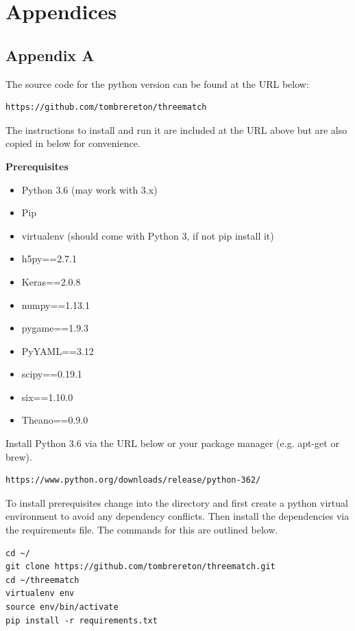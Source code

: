 \documentclass{bhamthesis}
\theoremstyle{definition}
\begin{document}
\chapter{Appendices}
\section*{Appendix A}
The source code for the python version can be found at the URL below:
\begin{verbatim}
https://github.com/tombrereton/threematch
\end{verbatim}

\noindent The instructions to install and run it are included at the URL above but are also copied in below for convenience.

\noindent \textbf{Prerequisites}

\begin{itemize}
	\item Python 3.6 (may work with 3.x)
	\item Pip
	\item virtualenv (should come with Python 3, if not pip install it)
	\item h5py==2.7.1
	\item Keras==2.0.8
	\item numpy==1.13.1
	\item pygame==1.9.3
	\item PyYAML==3.12
	\item scipy==0.19.1
	\item six==1.10.0
	\item Theano==0.9.0
\end{itemize}

\noindent Install Python 3.6 via the URL below or your package manager (e.g. apt-get or brew).

\begin{verbatim}
https://www.python.org/downloads/release/python-362/
\end{verbatim}

\noindent To install prerequisites change into the directory and first create a python virtual environment to avoid any 
dependency conflicts. Then install the dependencies via the requirements file. The commands for this are outlined below.

\begin{verbatim}
cd ~/
git clone https://github.com/tombrereton/threematch.git
cd ~/threematch
virtualenv env
source env/bin/activate
pip install -r requirements.txt
\end{verbatim}
\end{document}
